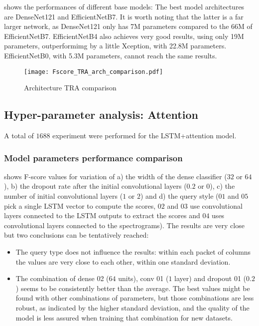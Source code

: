  shows the performances of different base models:
The best model architectures are DenseNet121 and EfficientNetB7.
It is worth noting that the latter is a far larger network, as DenseNet121 only
has 7M parameters compared to the 66M of EfficientNetB7.
EfficientNetB4 also achieves very good results, using only 19M parameters,
outperformimg by a little Xception, with 22.8M parameters.
EfficientNetB0, with 5.3M parameters, cannot reach the same results.



\begin{figure}[h!]
    \centering
    \texttt{[image: Fscore\_TRA\_arch\_comparison.pdf]}
    \caption{Architecture TRA comparison}%
    \label{fig:tra_comparison_arch}
\end{figure}

\subsection{Hyper-parameter analysis: Attention}

A total of $1688$
experiment were performed for the LSTM+attention model.

\subsubsection{Model parameters performance comparison}

 shows F-score values for 
variation of 
a)
the width of the dense classifier ($32$ or $64$),
b)
the dropout rate
after the initial convolutional layers
($0.2$ or $0$),
c)
the number of initial convolutional layers ($1$ or $2$)
and
d)
the query style ($01$ and $05$ pick a single LSTM vector to compute the scores,
$02$ and $03$ use convolutional layers connected to the LSTM outputs to extract
the scores and $04$  uses convolutional layers connected to the spectrograms).
The results are very close but two conclusions can be tentatively reached:

\begin{itemize}
    \item The query type does not influence the results: within each packet of
        columns the values are very close to each other, within one standard
        deviation.
    \item The combination of dense 02 ($64$ units), conv 01 ($1$ layer) and
        dropout 01 ($0.2$) seems to be consistently better than the average.
        The best values might be found with other combinations of parameters,
        but those combinations are less robust, as indicated by the higher
        standard deviation, and the quality of the model is less assured when
        training that combination for new datasets.
\end{itemize}

